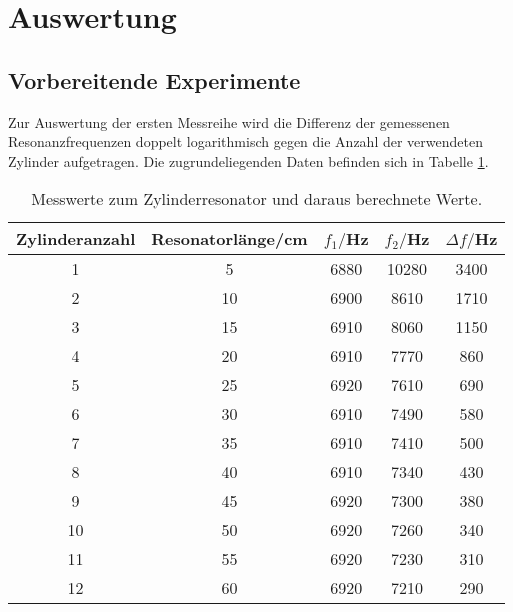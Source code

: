 \section{Auswertung}
\label{sec:Auswertung}

\subsection{Vorbereitende Experimente}
\label{subsec:vorbereitung}
Zur Auswertung der ersten Messreihe wird die Differenz der gemessenen
Resonanzfrequenzen doppelt logarithmisch gegen die Anzahl der verwendeten Zylinder
aufgetragen. Die zugrundeliegenden Daten befinden sich in Tabelle \ref{tab:zyl}.

\begin{table}[htp]
	\begin{center}
    \caption{Messwerte zum Zylinderresonator und daraus berechnete Werte.}
    \label{tab:zyl}
		\begin{tabular}{ccccc}
		\toprule
			{Zylinderanzahl} & {Resonatorlänge/cm} & {$f_1/$Hz} & {$f_2/$Hz} & {$\Delta f/$Hz}\\
			\midrule
			1 & 5 & 6880 & 10280 & 3400\\
			2 & 10 & 6900 & 8610 & 1710\\
			3 & 15 & 6910 & 8060 & 1150\\
			4 & 20 & 6910 & 7770 & 860\\
			5 & 25 & 6920 & 7610 & 690\\
			6 & 30 & 6910 & 7490 & 580\\
			7 & 35 & 6910 & 7410 & 500\\
			8 & 40 & 6910 & 7340 & 430\\
			9 & 45 & 6920 & 7300 & 380\\
			10 & 50 & 6920 & 7260 & 340\\
			11 & 55 & 6920 & 7230 & 310\\
			12 & 60 & 6920 & 7210 & 290\\
		\bottomrule
		\end{tabular}
	\end{center}
\end{table}

